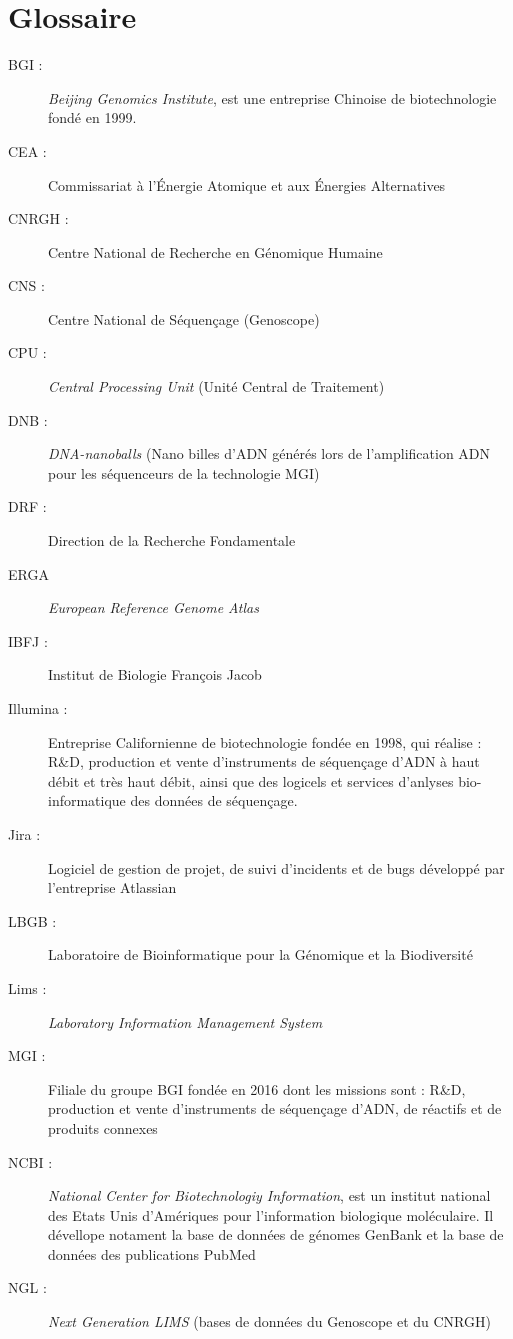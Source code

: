 \section*{Glossaire}

\begin{description}
    \item[BGI : ] \emph{Beijing Genomics Institute}, est une entreprise Chinoise de biotechnologie fondé en 1999.
    \item[CEA :] Commissariat à l'Énergie Atomique et aux Énergies Alternatives
    \item[CNRGH :] Centre National de Recherche en Génomique Humaine 
    \item[CNS :] Centre National de Séquençage (Genoscope)
    \item[CPU :] \emph{Central Processing Unit} (Unité Central de Traitement)
    \item[DNB :] \emph{DNA-nanoballs} (Nano \og billes\fg{} d'ADN générés lors de l'amplification ADN pour les séquenceurs de la technologie MGI)
    \item[DRF :] Direction de la Recherche Fondamentale
    \item[ERGA] \emph{European Reference Genome Atlas}
    \item[IBFJ :] Institut de Biologie François Jacob
    \item[Illumina :] Entreprise Californienne de biotechnologie fondée en 1998, qui réalise : R\&D, production et vente d’instruments de séquençage d’ADN à haut débit et très haut débit, ainsi que des logicels et services d'anlyses bio-informatique des données de séquençage.
    \item[Jira :] Logiciel de gestion de projet, de suivi d'incidents et de bugs développé par l'entreprise Atlassian
    \item[LBGB :] Laboratoire de Bioinformatique pour la Génomique et la Biodiversité
    \item[Lims :] \emph{Laboratory Information Management System}
    \item[MGI : ] Filiale du groupe BGI fondée en 2016 dont les missions sont : R\&D, production et vente d’instruments de séquençage 
    d’ADN, de réactifs et de produits connexes
    \item[NCBI :] \emph{National Center for Biotechnologiy Information}, est un institut national des Etats Unis d'Amériques pour l'information biologique moléculaire. Il dévellope notament la base de données de génomes GenBank et la base de données des publications PubMed
    \item[NGL :] \emph{Next Generation LIMS} (bases de données du Genoscope et du CNRGH)

\end{description}
